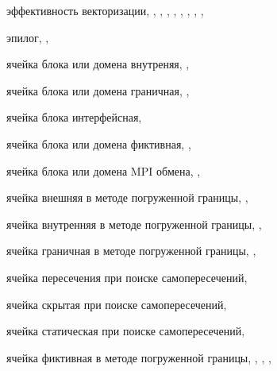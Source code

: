 эффективность векторизации, \pageref{term:vec_eff0}, \pageref{term:vec_eff}, \pageref{term:vec_eff2}, \pageref{term:vec_eff3}, \pageref{term:vec_eff4}, \pageref{term:vec_eff5}, \pageref{term:vec_eff6}, \pageref{term:vec_eff7}, \pageref{term:vec_eff8}

эпилог, \pageref{term:epilog}, \pageref{term:epilog2}

ячейка блока или домена внутреняя, \pageref{term:cell_block_inner}, \pageref{term:cell_block_inner2}

ячейка блока или домена граничная, \pageref{term:cell_block_border}, \pageref{term:cell_block_border2}

ячейка блока интерфейсная, \pageref{term:cell_block_interface}

ячейка блока или домена фиктивная, \pageref{term:cell_block_ghost}, \pageref{term:cell_block_ghost2}

ячейка блока или домена MPI обмена, \pageref{term:cell_block_mpi}, \pageref{term:cell_block_mpi2}

ячейка внешняя в методе погруженной границы, \pageref{term:cell_ibm_outer}, \pageref{term:cell_ibm_outer2}

ячейка внутренняя в методе погруженной границы, \pageref{term:cell_ibm_innner}, \pageref{term:cell_ibm_innner2}

ячейка граничная в методе погруженной границы, \pageref{term:cell_ibm_border}, \pageref{term:cell_ibm_border2}

ячейка пересечения при поиске самопересечений, \pageref{term:cell_intersect}

ячейка скрытая при поиске самопересечений, \pageref{term:cell_hidden}

ячейка статическая при поиске самопересечений, \pageref{term:cell_static}

ячейка фиктивная в методе погруженной границы, \pageref{term:cell_ibm_ghost}, \pageref{term:cell_ibm_ghost2}, \pageref{term:cell_ibm_ghost3}, \pageref{term:cell_ibm_ghost4}
